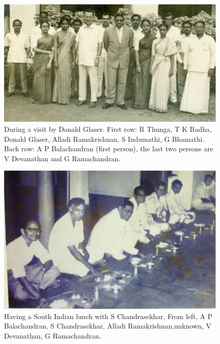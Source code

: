 \begin{figure}[H]
\centering
\includegraphics[scale=0.34]{src/images/chap25/4.eps}
\caption{During a visit by Donald Glaser. First row: R Thunga,
T K Radha, Donald Glaser, Alladi Ramakrishnan, S Indumathi, 
G Bhamathi. Back row: A P Balachandran (first person), the last two persons are V Devanathan and G Ramachandran.}
\end{figure}
\medskip

\begin{figure}[H]
\centering
\includegraphics[scale=0.34]{src/images/chap25/5.eps}
\caption{Having a South Indian lunch with S Chandrasekhar. From left, A P
Balachandran, S Chandrasekhar, Alladi Ramakrishnan,\break unknown, V Devanathan, G
Ramachandran.}
\end{figure}

